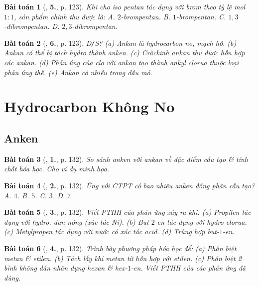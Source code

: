 \documentclass{article}
\numberwithin{equation}{section}
\newtheorem{baitoan}{Bài toán}[section]
\begin{document}
\begin{baitoan}[\cite{SGK_Hoa_Hoc_11_co_ban}, \textbf{5.}, p. 123]
	Khi cho iso pentan tác dụng với brom theo tỷ lệ mol $1:1$, sản phẩm chính thu được là: {\sf A.} $2$-brompentan. {\sf B.} $1$-brompentan. {\sf C.} $1,3$-đibrompentan. {\sf D.} $2,3$-đibrompentan.
\end{baitoan}

\begin{baitoan}[\cite{SGK_Hoa_Hoc_11_co_ban}, \textbf{6.}, p. 123]
	\emph{Đ\texttt{/}S?} (a) Ankan là hydrocarbon no, mạch hở. (b) Ankan có thể bị tách hydro thành anken. (c) Crăckinh ankan thu được hỗn hợp các ankan. (d) Phản ứng của clo với ankan tạo thành ankyl clorua thuộc loại phản ứng thế. (e) Ankan có nhiều trong dầu mỏ.
\end{baitoan}


\section{Hydrocarbon Không No}

\subsection{Anken}

\begin{baitoan}[\cite{SGK_Hoa_Hoc_11_co_ban}, \textbf{1.}, p. 132]
	So sánh anken với ankan về đặc điểm cấu tạo \& tính chất hóa học. Cho ví dụ minh họa.
\end{baitoan}

\begin{baitoan}[\cite{SGK_Hoa_Hoc_11_co_ban}, \textbf{2.}, p. 132]
	Ứng với CTPT \emph{} có bao nhiêu anken đồng phân cấu tạo? {\sf A.} $4$. {\sf B.} $5$. {\sf C.} $3$. {\sf D.} $7$.
\end{baitoan}

\begin{baitoan}[\cite{SGK_Hoa_Hoc_11_co_ban}, \textbf{3.}, p. 132]
	Viết PTHH của phản ứng xảy ra khi: (a) Propilen tác dụng với hydro, đun nóng (xúc tác \emph{Ni}). (b) But-$2$-en tác dụng với hydro clorua. (c) Metylpropen tác dụng với nước có xúc tác acid. (d) Trùng hợp but-$1$-en.
\end{baitoan}

\begin{baitoan}[\cite{SGK_Hoa_Hoc_11_co_ban}, \textbf{4.}, p. 132]
	Trình bày phương pháp hóa học để: (a) Phân biệt metan \& etilen. (b) Tách lấy khí metan từ hỗn hợp với etilen. (c) Phân biệt 2 bình không dán nhãn đựng hexan \& hex-$1$-en. Viết PTHH của các phản ứng đã dùng.
\end{baitoan}
\end{document}

